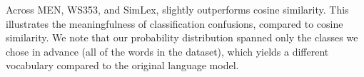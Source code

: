 Across MEN, WS353, and SimLex, \wc slightly outperforms cosine similarity. This illustrates the meaningfulness of classification confusions, compared to cosine similarity. We note that our probability distribution spanned only the classes we chose in advance (all of the words in the dataset), which yields a different vocabulary compared to the original language model.


